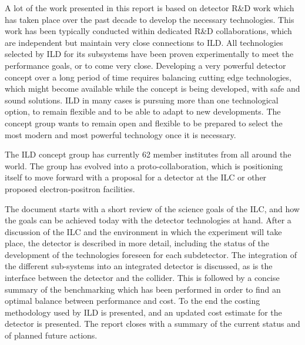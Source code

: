 A lot of the work presented in this report is based on detector R\&D work which has taken place over the past decade to develop the necessary technologies. 
This work has been typically conducted within dedicated R\&D collaborations, which are independent but maintain very close connections to ILD. All technologies selected by ILD for its subsystems have been proven experimentally to meet the performance goals, or to come very close. Developing a very powerful detector concept over a long period of time requires balancing cutting edge technologies, which might become available while the concept is being developed, with safe and sound solutions. ILD in many cases is pursuing more than one technological option, to remain flexible and to be able to adapt to new developments. The concept group  wants to remain open and flexible to be prepared to select the most modern and most powerful technology once it is necessary. 

The ILD concept group has currently 62 member institutes from all around the world. The group has evolved into a proto-collaboration, which is positioning itself to move forward with a proposal for a detector at the ILC or other proposed electron-positron facilities.

The document starts with a short review of the science goals of the ILC, and how the goals can be achieved today with the detector technologies at hand. After a discussion of the ILC and the environment in which the experiment will take place, the detector is described in more detail, including the status of the development of the technologies foreseen for each subdetector. The integration of the different sub-systems into an integrated detector is discussed, as is the interface between the detector and the collider. This is followed by a concise summary of the benchmarking which has been performed in order to find an optimal balance between performance and cost. To the end the costing methodology used by ILD is presented, and an updated cost estimate for the detector is presented. The report closes with a summary of the current status and of planned future actions. 

